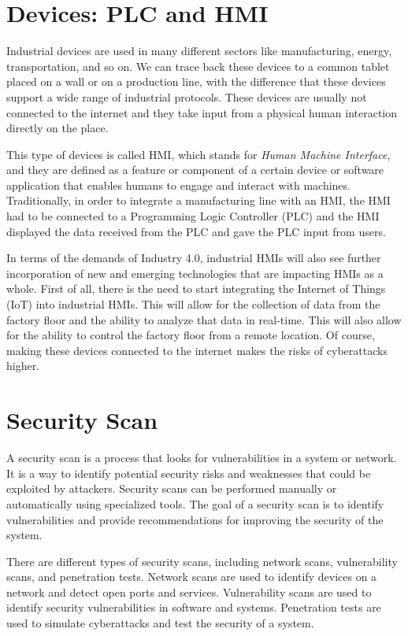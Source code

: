 \section{Devices: PLC and HMI}

Industrial devices are used in many different sectors like manufacturing, energy, transportation, and so on. We can trace back these devices to a common tablet placed on a wall or on a production line, with the difference that these devices support a wide range of industrial protocols. These devices are usually not connected to the internet and they take input from a physical human interaction directly on the place. 

This type of devices is called HMI, which stands for \textit{Human Machine Interface}, and they are defined as a feature or component of a certain device or software application that enables humans to engage and interact with machines.\\
Traditionally, in order to integrate a manufacturing line with an HMI, the HMI had to be connected to a Programming Logic Controller (PLC) and the HMI displayed the data received from the PLC and gave the PLC input from users.~\cite{what-is-hmi}

In terms of the demands of Industry 4.0, industrial HMIs will also see further incorporation of new and emerging technologies that are impacting HMIs as a whole. First of all, there is the need to start integrating the Internet of Things (IoT) into industrial HMIs. This will allow for the collection of data from the factory floor and the ability to analyze that data in real-time. This will also allow for the ability to control the factory floor from a remote location. Of course, making these devices connected to the internet makes the risks of cyberattacks higher.

\section{Security Scan}

A security scan is a process that looks for vulnerabilities in a system or network. It is a way to identify potential security risks and weaknesses that could be exploited by attackers. Security scans can be performed manually or automatically using specialized tools. The goal of a security scan is to identify vulnerabilities and provide recommendations for improving the security of the system.

There are different types of security scans, including network scans, vulnerability scans, and penetration tests. Network scans are used to identify devices on a network and detect open ports and services. Vulnerability scans are used to identify security vulnerabilities in software and systems. Penetration tests are used to simulate cyberattacks and test the security of a system.

